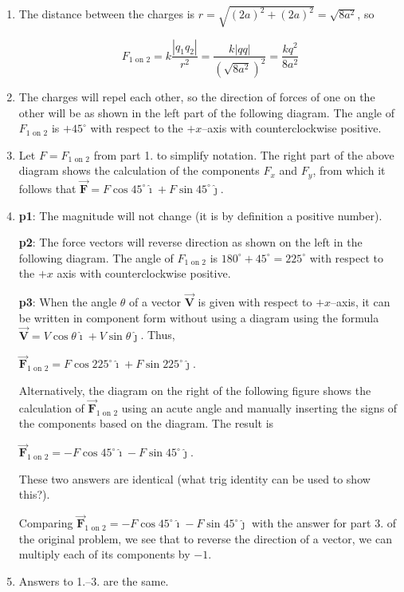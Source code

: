 \documentclass{article}
\renewcommand{\mbox}{\text}
\newcommand{\ihat}[0]{\hat{\boldsymbol{\imath}}}
\newcommand{\jhat}[0]{\hat{\boldsymbol{\jmath}}}
\newcommand{\bfvec}[1]{\vec{\mathbf{#1}}}
\begin{document}
\begin{enumerate}

  \item The distance between the charges is $r=\sqrt{(2a)^2+(2a)^2}=\sqrt{8a^2}$, so

        $$F_{1\mbox{ on } 2}=k\frac{|q_1q_2|}{r^2}=\frac{k|qq|}{(\sqrt{8a^2})^2}=\frac{kq^2}{8a^2}$$

  \item The charges will repel each other, so the direction of forces of one on the other will be as shown in the left part of the following diagram. The angle of $F_{1\mbox{ on } 2}$ is $+45^\circ$ with respect to the $+x$--axis with counterclockwise positive.

        

  \item Let $F = F_{1\mbox{ on } 2}$ from part 1. to simplify notation. The right part of the above diagram shows the calculation of the components $F_x$ and $F_y$, from which it follows that $\bfvec{F} = F\cos 45^\circ \ihat + F\sin 45^\circ \jhat$.

  \item 

        \textbf{p1}: The magnitude will not change (it is by definition a positive number).

        \textbf{p2}: The force vectors will reverse direction as shown on the left in the following diagram. The angle of $F_{1\mbox{ on } 2}$ is $180^\circ+45^\circ=225^\circ$ with respect to the $+x$ axis with counterclockwise positive.

        \textbf{p3}: When the angle $\theta$ of a vector $\bfvec{V}$ is given with respect to $+x$--axis, it can be written in component form without using a diagram using the formula $\bfvec{V} = V\cos\theta\ihat + V\sin\theta\jhat$. Thus,

        $\bfvec{F}_{1\mbox{ on } 2} = F\cos 225^\circ \ihat + F\sin 225^\circ \jhat$.

        Alternatively, the diagram on the right of the following figure shows the calculation of $\bfvec{F}_{1\mbox{ on } 2}$ using an acute angle and manually inserting the signs of the components based on the diagram. The result is

        $\bfvec{F}_{1\mbox{ on } 2} = -F\cos 45^\circ \ihat - F\sin 45^\circ \jhat$.

        These two answers are identical (what trig identity can be used to show this?).

        Comparing $\bfvec{F}_{1\mbox{ on } 2} = -F\cos 45^\circ \ihat - F\sin 45^\circ \jhat$ with the answer for part 3. of the original problem, we see that to reverse the direction of a vector, we can multiply each of its components by $-1$.

        

  \item Answers to 1.--3. are the same.

\end{enumerate}
\end{document}
